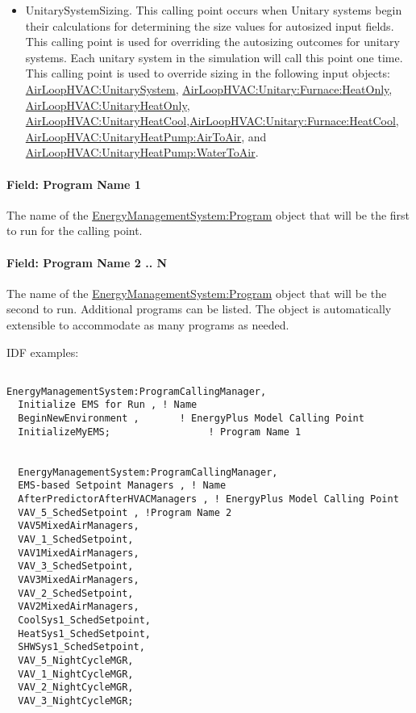 \begin{itemize}
\item
  UnitarySystemSizing. This calling point occurs when Unitary systems begin their calculations for determining the size values for autosized input fields. This calling point is used for overriding the autosizing outcomes for unitary systems. Each unitary system in the simulation will call this point one time. This calling point is used to override sizing in the following input objects: \hyperref[airloophvacunitarysystem]{AirLoopHVAC:UnitarySystem}, \hyperref[airloophvacunitaryfurnaceheatonly]{AirLoopHVAC:Unitary:Furnace:HeatOnly}, \hyperref[airloophvacunitaryheatonly]{AirLoopHVAC:UnitaryHeatOnly}, \hyperref[airloophvacunitaryheatcool]{AirLoopHVAC:UnitaryHeatCool},\hyperref[airloophvacunitaryfurnaceheatcool]{AirLoopHVAC:Unitary:Furnace:HeatCool}, \hyperref[airloophvacunitaryheatpumpairtoair]{AirLoopHVAC:UnitaryHeatPump:AirToAir}, and \hyperref[airloophvacunitaryheatpumpwatertoair]{AirLoopHVAC:UnitaryHeatPump:WaterToAir}.
\end{itemize}

\paragraph{Field: Program Name 1}\label{field-program-name-1}

The name of the \hyperref[energymanagementsystemprogram]{EnergyManagementSystem:Program} object that will be the first to run for the calling point.

\paragraph{Field: Program Name 2 .. N}\label{field-program-name-2-..-n}

The name of the \hyperref[energymanagementsystemprogram]{EnergyManagementSystem:Program} object that will be the second to run. Additional programs can be listed. The object is automatically extensible to accommodate as many programs as needed.

IDF examples:

\begin{lstlisting}

EnergyManagementSystem:ProgramCallingManager,
  Initialize EMS for Run , ! Name
  BeginNewEnvironment ,       ! EnergyPlus Model Calling Point
  InitializeMyEMS;                 ! Program Name 1


  EnergyManagementSystem:ProgramCallingManager,
  EMS-based Setpoint Managers , ! Name
  AfterPredictorAfterHVACManagers , ! EnergyPlus Model Calling Point
  VAV_5_SchedSetpoint , !Program Name 2
  VAV5MixedAirManagers,
  VAV_1_SchedSetpoint,
  VAV1MixedAirManagers,
  VAV_3_SchedSetpoint,
  VAV3MixedAirManagers,
  VAV_2_SchedSetpoint,
  VAV2MixedAirManagers,
  CoolSys1_SchedSetpoint,
  HeatSys1_SchedSetpoint,
  SHWSys1_SchedSetpoint,
  VAV_5_NightCycleMGR,
  VAV_1_NightCycleMGR,
  VAV_2_NightCycleMGR,
  VAV_3_NightCycleMGR;
\end{lstlisting}

